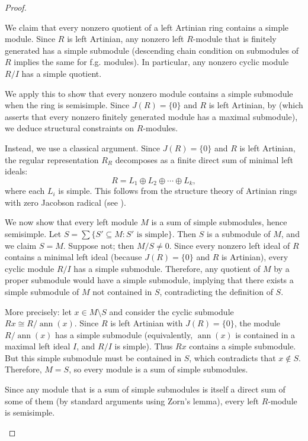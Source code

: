 \begin{proof}
\begin{enumerate}
        We claim that every nonzero quotient of a left Artinian ring contains a simple module. Since $R$ is left Artinian, any nonzero left $R$-module that is finitely generated has a simple submodule (descending chain condition on submodules of $R$ implies the same for f.g. modules). In particular, any nonzero cyclic module $R/I$ has a simple quotient.

        We apply this to show that every nonzero module contains a simple submodule when the ring is semisimple. Since $J(R) = \{0\}$ and $R$ is left Artinian, by  (which asserts that every nonzero finitely generated module has a maximal submodule), we deduce structural constraints on $R$-modules.

        Instead, we use a classical argument. Since $J(R) = \{0\}$ and $R$ is left Artinian, the regular representation $R_R$ decomposes as a finite direct sum of minimal left ideals:
        $$R = L_1 \oplus L_2 \oplus \cdots \oplus L_k,$$
        where each $L_i$ is simple. This follows from the structure theory of Artinian rings with zero Jacobson radical (see ).

        We now show that every left module $M$ is a sum of simple submodules, hence semisimple. Let $S = \sum \{S' \subseteq M : S' \text{ is simple}\}$. Then $S$ is a submodule of $M$, and we claim $S = M$. Suppose not; then $M/S \neq 0$. Since every nonzero left ideal of $R$ contains a minimal left ideal (because $J(R) = \{0\}$ and $R$ is Artinian), every cyclic module $R/I$ has a simple submodule. Therefore, any quotient of $M$ by a proper submodule would have a simple submodule, implying that there exists a simple submodule of $M$ not contained in $S$, contradicting the definition of $S$.

        More precisely: let $x \in M \setminus S$ and consider the cyclic submodule $Rx \cong R/\operatorname{ann}(x)$. Since $R$ is left Artinian with $J(R) = \{0\}$, the module $R/\operatorname{ann}(x)$ has a simple submodule (equivalently, $\operatorname{ann}(x)$ is contained in a maximal left ideal $I$, and $R/I$ is simple). Thus $Rx$ contains a simple submodule. But this simple submodule must be contained in $S$, which contradicts that $x \notin S$. Therefore, $M = S$, so every module is a sum of simple submodules.

        Since any module that is a sum of simple submodules is itself a direct sum of some of them (by standard arguments using Zorn's lemma), every left $R$-module is semisimple.


\end{enumerate}
\end{proof}
